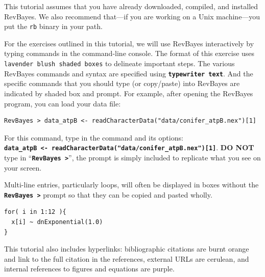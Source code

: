 \documentclass[11pt]{article}
\newcommand{\cl}[1]{{\texttt{\textbf{#1}}}}
\begin{document}
This tutorial assumes that you have already downloaded, compiled, and installed RevBayes. 
We also recommend that---if you are working on a Unix machine---you put the {\tt rb} binary in your path.

For the exercises outlined in this tutorial, we will use RevBayes interactively by typing commands in the command-line console.
The format of this exercise uses \colorbox{shadecolor}{\tt lavender blush shaded boxes} to delineate important steps. 
The various RevBayes commands and syntax are specified using \cl{typewriter text}. And the specific commands that you should type (or copy/paste) into RevBayes are indicated by shaded box and prompt. For example, after opening the RevBayes program, you can load your data file:

{\tt \begin{snugshade*}
\begin{lstlisting}
RevBayes > data_atpB <- readCharacterData("data/conifer_atpB.nex")[1]
\end{lstlisting}
\end{snugshade*}}

For this command, type in the command and its options:\\ \cl{data\_atpB <- readCharacterData("data/conifer\_atpB.nex")[1]}. \textbf{DO NOT} type in ``\cl{RevBayes >}'', the prompt is simply included to replicate what you see on your screen. 

Multi-line entries, particularly loops, will often be displayed in boxes without the \cl{RevBayes >} prompt so that they can be copied and pasted wholly. 
{\tt \begin{snugshade*}
\begin{lstlisting}
for( i in 1:12 ){
  x[i] ~ dnExponential(1.0)
}
\end{lstlisting}
\end{snugshade*}}


%


This tutorial also includes hyperlinks: bibliographic citations are {\textcolor{citescol}{burnt orange}} and link to the full citation in the references, external URLs are {\textcolor{urlscol}{cerulean}}, and internal references to figures and equations are {\textcolor{linkscol}{purple}}.
\end{document}
